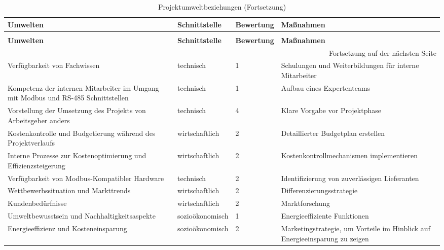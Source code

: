 \begin{longtable}{p{} | p{} | p{} | p{}}
	\caption{Projektumweltbeziehungen}
	\label{tab:umweltbeziehungen}
	\\ \toprule
	\textbf{Umwelten} & \textbf{Schnittstelle} & \textbf{Bewertung} & \textbf{Maßnahmen}
	\\ \midrule
	\endfirsthead
	\caption{Projektumweltbeziehungen (Fortsetzung)}
	\\ \toprule
	\textbf{Umwelten} & \textbf{Schnittstelle} & \textbf{Bewertung} & \textbf{Maßnahmen}
	\\ \midrule
	\endhead
	\midrule
	\multicolumn{4}{r}{{Fortsetzung auf der nächsten Seite}} 
	\\ \bottomrule
	\endfoot
	\bottomrule
	\endlastfoot
	Verfügbarkeit von Fachwissen & technisch & 1 & Schulungen und Weiterbildungen für interne Mitarbeiter \\
	\midrule
	Kompetenz der internen Mitarbeiter im Umgang mit Modbus und RS-485 Schnittstellen & technisch & 1 & Aufbau eines Expertenteams \\
	\midrule
	Vorstellung der Umsetzung des Projekts von Arbeitsgeber anders & technisch & 4 & Klare Vorgabe vor Projektphase \\
	\midrule
	Kostenkontrolle und Budgetierung während des Projektverlaufs & wirtschaftlich & 2 & Detaillierter Budgetplan erstellen \\
	Interne Prozesse zur Kostenoptimierung und Effizienzsteigerung & wirtschaftlich & 2 & Kostenkontrollmechanismen implementieren \\
	\midrule
	Verfügbarkeit von Modbus-Kompatibler Hardware & technisch & 2 & Identifizierung von zuverlässigen Lieferanten \\
	\midrule
	Wettbewerbssituation und Markttrends & wirtschaftlich & 2 & Differenzierungsstrategie \\
	\midrule
	Kundenbedürfnisse & wirtschaftlich & 2 & Marktforschung \\
	\midrule
	Umweltbewusstsein und Nachhaltigkeitsaspekte & sozioökonomisch & 1 & Energieeffiziente Funktionen \\
	\midrule
	Energieeffizienz und Kosteneinsparung & sozioökonomisch & 2 & Marketingstrategie, um Vorteile im Hinblick auf Energieeinsparung zu zeigen \\
\end{longtable}
